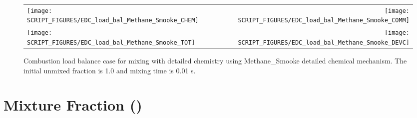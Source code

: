 \documentclass[11pt]{book}
\begin{document}
\begin{figure}[p]
\begin{tabular*}{\textwidth}{lr}
\texttt{[image: SCRIPT\_FIGURES/EDC\_load\_bal\_Methane\_Smooke\_CHEM]} &
\texttt{[image: SCRIPT\_FIGURES/EDC\_load\_bal\_Methane\_Smooke\_COMM]} \\
\texttt{[image: SCRIPT\_FIGURES/EDC\_load\_bal\_Methane\_Smooke\_TOT]} &
\texttt{[image: SCRIPT\_FIGURES/EDC\_load\_bal\_Methane\_Smooke\_DEVC]}
\end{tabular*}
\caption[Results of the  test cases]{Combustion load balance case for mixing with detailed chemistry using Methane\_Smooke detailed chemical mechanism. The initial unmixed fraction is 1.0 and mixing time is 0.01 s.}
\label{fig:EDC_load_bal_methane_smooke}
\end{figure}

\section{Mixture Fraction ()}
\label{Mix_Frac}
\label{burke_schumann_spec}
\label{burke_schumann_temp}
\end{document}
